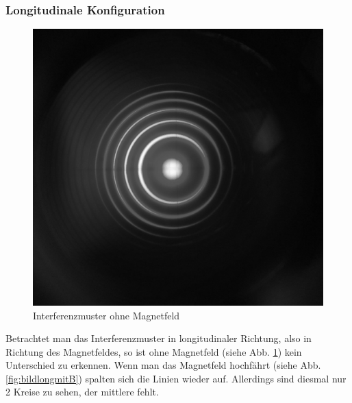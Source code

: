\subsubsection{Longitudinale Konfiguration}
\begin{figure}
\centering
\includegraphics[scale=0.1]{data/bilder_okular/bild_5_edit.jpg}
\caption{Interferenzmuster ohne Magnetfeld}
\label{fig:bildlongohneB}
\end{figure}
Betrachtet man das Interferenzmuster in longitudinaler Richtung, also in Richtung des Magnetfeldes, so ist ohne Magnetfeld (siehe Abb. \ref{fig:bildlongohneB}) kein Unterschied zu erkennen. Wenn man das Magnetfeld hochfährt (siehe Abb. \ref{fig:bildlongmitB}) spalten sich die Linien wieder auf. Allerdings sind diesmal nur 2 Kreise zu sehen, der mittlere fehlt.
